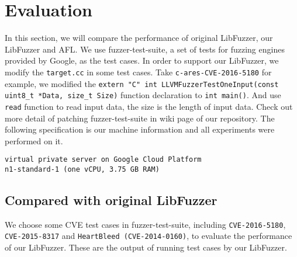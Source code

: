 
\section{Evaluation}
\label{sec:eval}

In this section, we will compare the performance of original LibFuzzer, our LibFuzzer and AFL. We use fuzzer-test-suite, a set of tests for fuzzing engines provided by Google, as the test cases. In order to support our LibFuzzer, we modify the \texttt{target.cc} in some test cases. Take \texttt{c-ares-CVE-2016-5180} for example, we modified the \texttt{extern "C" int LLVMFuzzerTestOneInput(const uint8\_t *Data, size\_t Size)} function declaration to \texttt{int main()}. And use \texttt{read} function to read input data, the size is the length of input data. Check out more detail of patching fuzzer-test-suite in wiki page of our repository. The following specification is our machine information and all experiments were performed on it.

\begin{lstlisting}
virtual private server on Google Cloud Platform
n1-standard-1 (one vCPU, 3.75 GB RAM)
\end{lstlisting}

\subsection{Compared with original LibFuzzer}

We choose some CVE test cases in fuzzer-test-suite, including \texttt{CVE-2016-5180}, \texttt{CVE-2015-8317} and \texttt{HeartBleed (CVE-2014-0160)}, to evaluate the performance of our LibFuzzer. These are the output of running test cases by our LibFuzzer.

